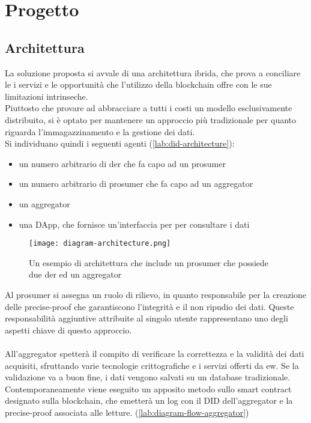 \chapter{Progetto}

\section{Architettura}
La soluzione proposta si avvale di una architettura ibrida, che prova a conciliare le i servizi e le opportunità
che l'utilizzo della blockchain offre con le sue limitazioni intrinseche. \\
Piuttosto che provare ad abbracciare a tutti i costi un modello esclusivamente distribuito, si è optato per
mantenere un approccio più tradizionale per quanto riguarda l'immagazzinamento e la gestione dei dati. \\

Si individuano quindi i seguenti agenti (\autoref{lab:did-architecture}):
\begin{itemize}
    \item un numero arbitrario di \gls{der} che fa capo ad un \gls{prosumer}
    \item un numero arbitrario di \gls{prosumer} che fa capo ad un \gls{aggregator}
    \item un \gls{aggregator}
    \item una DApp, che fornisce un'interfaccia per per consultare i dati
\end{itemize}

\begin{figure}[h]
    \texttt{[image: diagram-architecture.png]}
    \centering
    \caption{Un esempio di architettura che include un \gls{prosumer} che possiede due \gls{der} ed un \gls{aggregator}}
    \label{lab:diagram-architecture}
\end{figure}

Al \gls{prosumer} si assegna un ruolo di rilievo, in quanto responsabile per la creazione delle precise-proof
che garantiscono l'integrità e il non ripudio dei dati. 
Queste responsabilità aggiuntive attribuite al singolo utente rappresentano uno degli aspetti chiave di questo approccio. \\
\\
All'\gls{aggregator} spetterà il compito di verificare la correttezza e la validità dei dati acquisiti,
sfruttando varie tecnologie crittografiche e i servizi offerti da \gls{ew}.
Se la validazione va a buon fine, i dati vengono salvati su un database tradizionale. \\
Contemporaneamente viene eseguito un apposito metodo sullo smart contract designato sulla blockchain,
che emetterà un log con il DID dell'\gls{aggregator} e la precise-proof associata alle letture. (\autoref{lab:diagram-flow-aggregator})\\

